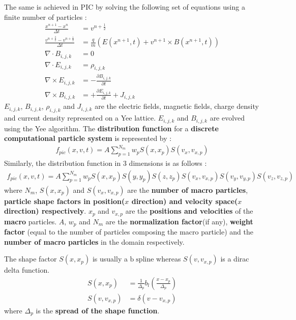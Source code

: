 \documentclass{article}
\begin{document}
The same is achieved in PIC by solving the following set of equations using a finite number of particles :
\begin{align}
\frac{x^{n+1}-x^{n}}{\Delta t} &= v^{n+\frac{1}{2}} \\
\frac{v^{n+\frac{3}{2}}-v^{n+\frac{1}{2}}}{\Delta t} &= \frac{q}{m}\left(E(x^{n+1},t) + v^{n+1} \times B(x^{n+1},t)\right)\\
\nabla \cdot B_{i,j,k} &= 0  \label{m1_pic}\\ 
\nabla \cdot E_{i,j,k} &= \rho_{i,j,k}  \label{m2_pic}\\
\nabla \times E_{i,j,k} &= - \frac{\partial B_{i,j,k}}{\partial t}  \label{m3_pic}\\
\nabla \times B_{i,j,k} &= + \frac{\partial E_{i,j,k}}{\partial t} + J_{i,j,k}  \label{m4_pic}
\end{align}
$E_{i,j,k}$, $B_{i,j,k}$, $\rho_{i,j,k}$ and $J_{i,j,k}$ are the electric fields, magnetic fields, charge density and current density represented on a Yee lattice. $E_{i,j,k}$ and $B_{i,j,k}$ are evolved using the Yee algorithm. The \textbf{distribution function} for a \textbf{discrete computational particle system} is represented by :
\begin{align}
f_{pic}(x, v, t) = A\sum_{p=1}^{N_{m}} w_{p}S(x, x_{p})S(v_{x}, v_{x,p}) \label{distribution}
\end{align}
Similarly, the distribution function in 3 dimensions is as follows :
\begin{align}
f_{pic}(x, v, t) = A\sum_{p=1}^{N_{m}} w_{p}S(x, x_{p})S(y, y_{p})S(z, z_{p})S(v_{x}, v_{x,p})S(v_{y}, v_{y,p})S(v_{z}, v_{z,p}) 
\end{align}
where $N_{m}$, $S(x, x_{p})$ and $S(v_{x}, v_{x,p})$ are the \textbf{number of macro particles}, \textbf{particle shape factors in position($x$ direction) and velocity space($x$ direction) respectively}. $x_{p}$ and $v_{x,p}$ are the \textbf{positions and velocities} of the \textbf{macro} particles. $A$, $w_{p}$ and $N_{m}$ are the \textbf{normalization factor}(if any), \textbf{weight factor} (equal to the number of particles composing the macro particle) and the \textbf{number of macro particles} in the domain respectively.

The shape factor $S(x,x_{p})$ is usually a $\mathrm{b\;spline}$ whereas $S(v, v_{x,p})$ is a dirac delta function.
\begin{align}
S(x,x_{p}) &= \frac{1}{\Delta_{p}}b_{l}\left(\frac{x-x_{p}}{\Delta_{p}}\right) \\
S(v, v_{x,p}) &= \delta (v-v_{x,p})
\end{align}
where $\Delta_{p}$ is the \textbf{spread of the shape function}.
\end{document}

